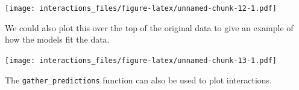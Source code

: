 \documentclass[]{article}
\newenvironment{Shaded}{\begin{snugshade}}{\end{snugshade}}
\newcommand{\DataTypeTok}[1]{\textcolor[rgb]{0.13,0.29,0.53}{#1}}
\newcommand{\KeywordTok}[1]{\textcolor[rgb]{0.13,0.29,0.53}{\textbf{#1}}}
\newcommand{\NormalTok}[1]{#1}
\newcommand{\OperatorTok}[1]{\textcolor[rgb]{0.81,0.36,0.00}{\textbf{#1}}}
\newcommand{\StringTok}[1]{\textcolor[rgb]{0.31,0.60,0.02}{#1}}
\begin{document}
\texttt{[image: interactions\_files/figure-latex/unnamed-chunk-12-1.pdf]}

We could also plot this over the top of the original data to give an example of
how the models fit the data.

\begin{Shaded}
\end{Shaded}

\texttt{[image: interactions\_files/figure-latex/unnamed-chunk-13-1.pdf]}

The \texttt{gather\_predictions} function can also be used to plot interactions.
\end{document}

